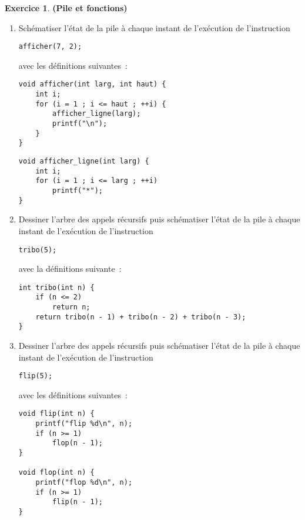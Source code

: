 \documentclass[12pt]{article}
\theoremstyle{definition}
\newtheorem{Exercice}{Exercice}
\begin{document}
\begin{Exercice} {\bf (Pile et fonctions)}\smallskip

\begin{enumerate}
    \item Schématiser l'état de la pile à chaque instant de l'exécution
    de l'instruction
    \begin{lstlisting}
afficher(7, 2);
    \end{lstlisting}
    avec les définitions suivantes~:
    \begin{multicols}{2}
\begin{lstlisting}
void afficher(int larg, int haut) {
    int i;
    for (i = 1 ; i <= haut ; ++i) {
        afficher_ligne(larg);
        printf("\n");
    }
}
\end{lstlisting}
\begin{lstlisting}
void afficher_ligne(int larg) {
    int i;
    for (i = 1 ; i <= larg ; ++i)
        printf("*");
}
\end{lstlisting}
    \end{multicols}
    \smallskip

    \item Dessiner l'arbre des appels récursifs puis schématiser l'état 
    de la pile à chaque instant de l'exécution de l'instruction
    \begin{lstlisting}
tribo(5);
    \end{lstlisting}
    avec la définitions suivante~:
\begin{lstlisting}
int tribo(int n) {
    if (n <= 2)
        return n;
    return tribo(n - 1) + tribo(n - 2) + tribo(n - 3);
}
\end{lstlisting}
    \smallskip

\item Dessiner l'arbre des appels récursifs puis schématiser l'état 
    de la pile à chaque instant de l'exécution de l'instruction
    \begin{lstlisting}
flip(5);
    \end{lstlisting}
    avec les définitions suivantes~:
    \begin{multicols}{2}
\begin{lstlisting}
void flip(int n) {
    printf("flip %d\n", n);
    if (n >= 1) 
        flop(n - 1);
}

void flop(int n) {
    printf("flop %d\n", n);
    if (n >= 1) 
        flip(n - 1);
}
\end{lstlisting}
    \end{multicols}
\end{enumerate}
\end{Exercice}
\bigskip
\end{document}
